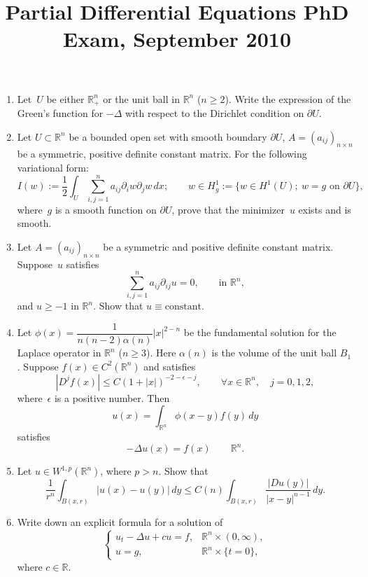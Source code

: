 \documentclass[11pt,letterpaper]{article}
\title{Partial Differential Equations PhD Exam, September 2010}
\author{}
\date{}
\newenvironment{examproblems}[2]{%
  \def\ProblemHeadingTag{#2}%
  \AssignTaggingSocketPlug{block/list/label}{examproblem}%
  \begin{enumerate}%
  \setcounter{enumi}{#1}%
  \renewcommand{\labelenumi}{\textbf{\theenumi.}}%
  \setlength{\topsep}{0.35em}%
  \setlength{\partopsep}{0pt}%
  \setlength{\itemsep}{0.48em}%
  \setlength{\parsep}{0.18em}%
}{\end{enumerate}}
\begin{document}
\maketitle
\thispagestyle{empty}
\begin{examproblems}{0}{H2}
\def\ProblemHeadingText{Problem 1.}
\item
Let~\(U\) be either \(\mathbb R_+^n\) or the unit ball in \(\mathbb R^n\) (\(n\ge 2\)). Write the expression of the Green’s function for \(-\Delta\) with respect to the Dirichlet condition on \(\partial U\).
\def\ProblemHeadingText{Problem 2.}
\item
Let \(U\subset\mathbb R^n\) be a bounded open set with smooth boundary \(\partial U\), \(A=(a_{ij})_{n\times n}\) be a symmetric, positive definite constant matrix. For the following variational form:
\[
I(w):=\frac12\int_U\sum_{i,j=1}^n a_{ij}\partial_iw\partial_jw\,dx;\qquad w\in H_g^1:=\{w\in H^1(U);\ w=g\text{ on }\partial U\},
\]
 where~\(g\) is a smooth function on \(\partial U\), prove that the minimizer~\(u\) exists and is smooth.
\def\ProblemHeadingText{Problem 3.}
\item
Let \(A=(a_{ij})_{n\times n}\) be a symmetric and positive definite constant matrix. Suppose~\(u\) satisfies
\[
\sum_{i,j=1}^n a_{ij}\partial_{ij}u=0,\qquad \text{in }\mathbb R^n,
\]
 and \(u\ge -1\) in \(\mathbb R^n\). Show that \(u\equiv\text{constant}\).
\def\ProblemHeadingText{Problem 4.}
\item
Let \(\phi(x)=\dfrac{1}{n(n-2)\alpha(n)}|x|^{2-n}\) be the fundamental solution for the Laplace operator in \(\mathbb R^n\) (\(n\ge 3\)). Here \(\alpha(n)\) is the volume of the unit ball \(B_1\). Suppose \(f(x)\in C^2(\mathbb R^n)\) and satisfies
\[
|D^jf(x)|\le C(1+|x|)^{-2-\epsilon-j},\qquad \forall x\in\mathbb R^n,\quad j=0,1,2,
\]
 where~\(\epsilon\) is a positive number. Then
\[
u(x)=\int_{\mathbb R^n}\phi(x-y)f(y)\,dy
\]
 satisfies
\[
-\Delta u(x)=f(x)\qquad \mathbb R^n.
\]
\def\ProblemHeadingText{Problem 5.}
\item
Let \(u\in W^{1,p}(\mathbb R^n)\), where \(p>n\). Show that
\[
\frac{1}{r^n}\int_{B(x,r)}|u(x)-u(y)|\,dy\le C(n)\int_{B(x,r)}\frac{|Du(y)|}{|x-y|^{n-1}}\,dy.
\]
\def\ProblemHeadingText{Problem 6.}
\item
Write down an explicit formula for a solution of
\[
\begin{cases}
u_t-\Delta u+cu=f, & \mathbb R^n\times(0,\infty),\\
u=g, & \mathbb R^n\times\{t=0\},
\end{cases}
\]
 where \(c\in\mathbb R\).

\end{examproblems}
\end{document}
